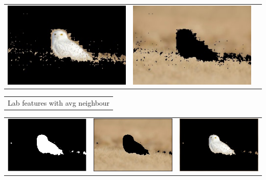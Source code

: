 \documentclass{article}
\begin{document}
\begin{center}
\begin{tabular}{c c c}
 \includegraphics[width=.4\linewidth]{../image-segmentation/output/add-Lab-neighbor-diff-feature/owl_seg1.jpg} & \includegraphics[width=.4\linewidth]{../image-segmentation/output/add-Lab-neighbor-diff-feature/owl_seg2.jpg} \\
  
 \end{tabular}
 \begin{tabular}{c}

Lab features with avg neighbour \\
\end{tabular}
 \begin{tabular}{c c c} 

 \includegraphics[width=.4\linewidth]{../image-segmentation/output/add-Lab-neighbor-avg-feature/owl_mask.jpg} & 
 
 \includegraphics[width=.4\linewidth]{../image-segmentation/output/add-Lab-neighbor-avg-feature/owl_seg1.jpg} & \includegraphics[width=.4\linewidth]{../image-segmentation/output/add-Lab-neighbor-avg-feature/owl_seg2.jpg} \\
  
 \end{tabular}
 
 
\end{center}
\end{document}
